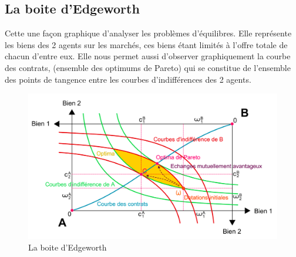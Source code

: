 \subsection{La boite d'Edgeworth}

Cette une façon graphique d'analyser les problèmes d'équilibres. Elle représente les biens des 2 agents sur les marchés, ces biens étant limités à l'offre totale de chacun d'entre eux. Elle nous permet aussi d'observer graphiquement la courbe des contrats, (ensemble des optimums de Pareto) qui se constitue de l'ensemble des points de tangence entre les courbes d'indifférences des 2 agents.
\newpage
\begin{figure}[h]
\begin{center}
\includegraphics[scale=0.3]{./img/IM2}
\caption{La boite d'Edgeworth}
\end{center}
\end{figure}
